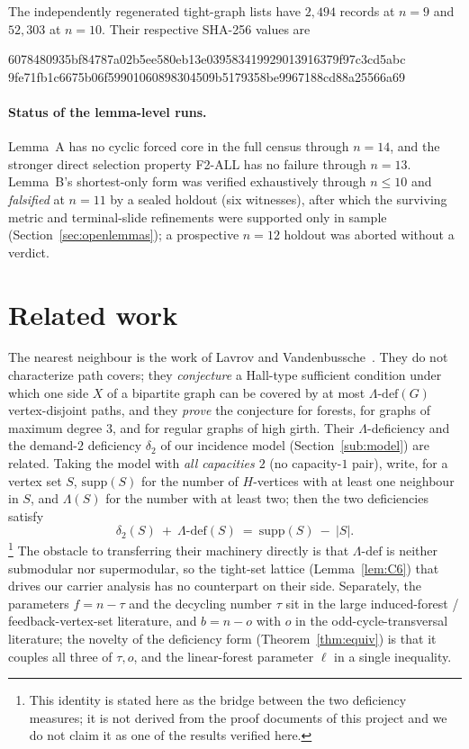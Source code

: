 \documentclass[11pt]{article}
\theoremstyle{plain}
\theoremstyle{definition}
\newcommand{\FVS}{\tau}
\newcommand{\OCT}{o}
\newcommand{\lf}{\ell}
\begin{document}
The independently regenerated tight-graph lists have $2,494$ records at $n=9$
and $52,303$ at $n=10$.  Their respective SHA-256 values are
\begin{center}
\scriptsize\ttfamily
6078480935bf84787a02b5ee580eb13e039583419929013916379f97c3cd5abc\\
9fe71fb1c6675b06f59901060898304509b5179358be9967188cd88a25566a69
\end{center}

\paragraph{Status of the lemma-level runs.} Lemma~A has no cyclic forced core
in the full census through $n=14$, and the stronger direct selection property
F2-ALL has no failure through $n=13$.  Lemma~B's shortest-only form was verified
exhaustively through $n\le10$ and \emph{falsified} at $n=11$ by a sealed holdout
(six witnesses), after which the surviving metric and terminal-slide
refinements were supported only in sample
(Section~\ref{sec:openlemmas}); a prospective $n=12$ holdout was aborted
without a verdict.

\section{Related work}\label{sec:related}

The nearest neighbour is the work of Lavrov and Vandenbussche~\cite{LV2024}. They
do not characterize path covers; they \emph{conjecture} a Hall-type sufficient
condition under which one side $X$ of a bipartite graph can be covered by at most
$\Lambda\text{-def}(G)$ vertex-disjoint paths, and they \emph{prove} the
conjecture for forests, for graphs of maximum degree $3$, and for regular graphs
of high girth. Their $\Lambda$-deficiency and the demand-$2$ deficiency
$\delta_2$ of our incidence model (Section~\ref{sub:model}) are related. Taking
the model with \emph{all capacities $2$} (no capacity-$1$ pair), write, for a
vertex set $S$, $\mathrm{supp}(S)$ for the number of $H$-vertices with at least
one neighbour in $S$, and $\Lambda(S)$ for the number with at least two; then the
two deficiencies satisfy
\[
\delta_2(S)\ +\ \Lambda\text{-def}(S)\ =\ \mathrm{supp}(S)\ -\ |S|.
\]\footnote{This identity is stated here as the bridge between the two deficiency
measures; it is not derived from the proof documents of this project and we do
not claim it as one of the results verified here.}
The obstacle to transferring their machinery directly is that
$\Lambda\text{-def}$ is neither submodular nor supermodular, so the tight-set
lattice (Lemma~\ref{lem:C6}) that drives our carrier analysis has no counterpart
on their side. Separately, the parameters $f=n-\FVS$ and the decycling number $\FVS$ sit
in the large induced-forest / feedback-vertex-set literature, and $b=n-\OCT$ with
$\OCT$ in the odd-cycle-transversal literature; the novelty of the deficiency
form (Theorem~\ref{thm:equiv}) is that it couples all three of $\FVS,\OCT$, and
the linear-forest parameter $\lf$ in a single inequality.
\end{document}
